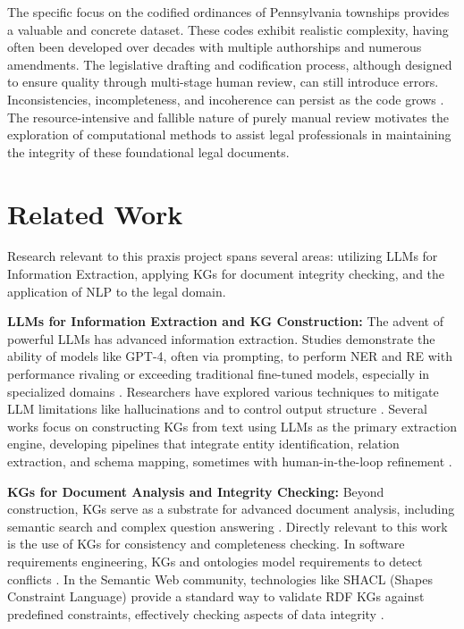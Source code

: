 The specific focus on the codified ordinances of Pennsylvania townships provides a valuable and concrete dataset. These codes exhibit realistic complexity, having often been developed over decades with multiple authorships and numerous amendments. The legislative drafting and codification process, although designed to ensure quality through multi-stage human review, can still introduce errors. Inconsistencies, incompleteness, and incoherence can persist as the code grows \parencite{RefWorks:RefID:54-rossi2016inconsistent}. The resource-intensive and fallible nature of purely manual review motivates the exploration of computational methods to assist legal professionals in maintaining the integrity of these foundational legal documents.

\section{Related Work} %
Research relevant to this praxis project spans several areas: utilizing LLMs for Information Extraction, applying KGs for document integrity checking, and the application of NLP to the legal domain.

\textbf{LLMs for Information Extraction and KG Construction:}
The advent of powerful LLMs has advanced information extraction. Studies demonstrate the ability of models like GPT-4, often via prompting, to perform NER and RE with performance rivaling or exceeding traditional fine-tuned models, especially in specialized domains \parencite{RefWorks:RefID:160-xu2024large}. Researchers have explored various techniques to mitigate LLM limitations like hallucinations and to control output structure \parencite{RefWorks:RefID:87-wang2023gptner}. Several works focus on constructing KGs from text using LLMs as the primary extraction engine, developing pipelines that integrate entity identification, relation extraction, and schema mapping, sometimes with human-in-the-loop refinement \parencite{RefWorks:RefID:107-benjira2025automated, RefWorks:RefID:162-lairgi2024knowledge}.

\textbf{KGs for Document Analysis and Integrity Checking:}
Beyond construction, KGs serve as a substrate for advanced document analysis, including semantic search and complex question answering \parencite{RefWorks:RefID:102-hogan2021knowledge, RefWorks:RefID:118-ji2022survey}. Directly relevant to this work is the use of KGs for consistency and completeness checking. In software requirements engineering, KGs and ontologies model requirements to detect conflicts \parencite{RefWorks:RefID:29-umar2024advances}. In the Semantic Web community, technologies like SHACL (Shapes Constraint Language) provide a standard way to validate RDF KGs against predefined constraints, effectively checking aspects of data integrity \parencite{RefWorks:RefID:154-knublauch2017shapes}.

